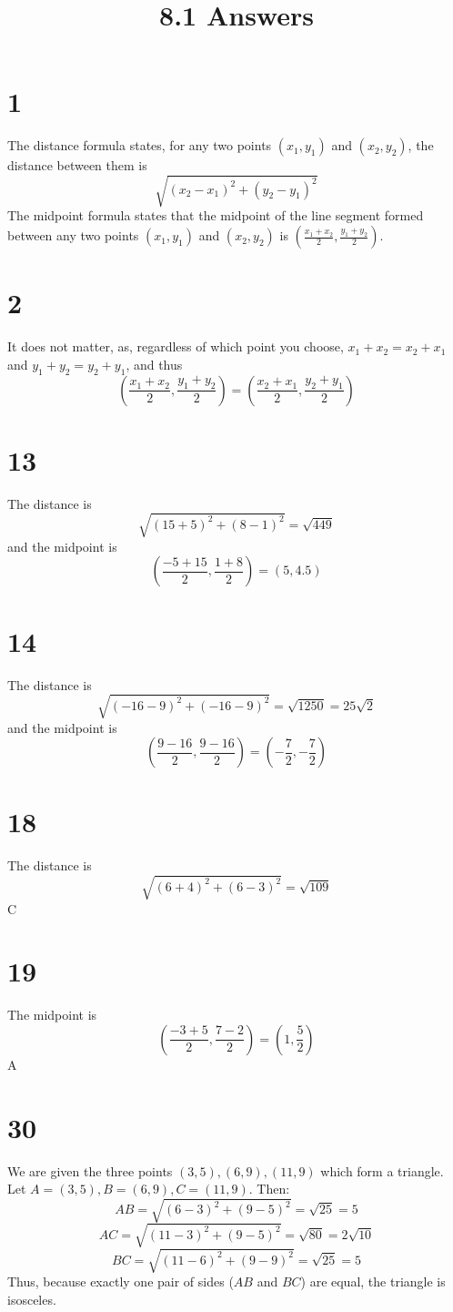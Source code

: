 \documentclass{article}
\title{8.1 Answers}
\theoremstyle{definition}
\newcommand{\?}{\stackrel{?}{=}}
\begin{document}
\maketitle

\section*{1}
The distance formula states, for any two points $(x_1,y_1)$ and $(x_2,y_2)$, the distance between them is \[ \sqrt{(x_2-x_1)^2+(y_2-y_1)^2} \]
The midpoint formula states that the midpoint of the line segment formed between any two points $(x_1,y_1)$ and $(x_2,y_2)$ is
$(\frac{x_1+x_2}{2},\frac{y_1+y_2}{2})$.

\section*{2}
It does not matter, as, regardless of which point you choose, $x_1+x_2=x_2+x_1$ and $y_1+y_2=y_2+y_1$, and thus
\[ (\frac{x_1+x_2}{2},\frac{y_1+y_2}{2})=(\frac{x_2+x_1}{2},\frac{y_2+y_1}{2}) \]

\section*{13}
The distance is \[ \sqrt{(15+5)^2+(8-1)^2}=\sqrt{449} \]
and the midpoint is \[ (\frac{-5+15}{2},\frac{1+8}{2})=(5,4.5) \]

\section*{14}
The distance is \[ \sqrt{(-16-9)^2+(-16-9)^2}=\sqrt{1250}=25\sqrt{2} \]
and the midpoint is \[ (\frac{9-16}{2},\frac{9-16}{2})=(-\frac{7}{2},-\frac{7}{2}) \]

\section*{18}
The distance is \[ \sqrt{(6+4)^2+(6-3)^2}=\sqrt{109} \]
C

\section*{19}
The midpoint is \[ (\frac{-3+5}{2},\frac{7-2}{2})=(1,\frac{5}{2}) \]
A

\section*{30}
We are given the three points $(3,5),(6,9),(11,9)$ which form a triangle. Let $A=(3,5),B=(6,9),C=(11,9)$. Then:
\[ AB=\sqrt{(6-3)^2+(9-5)^2}=\sqrt{25}=5 \]
\[ AC=\sqrt{(11-3)^2+(9-5)^2}=\sqrt{80}=2\sqrt{10} \]
\[ BC=\sqrt{(11-6)^2+(9-9)^2}=\sqrt{25}=5 \]
Thus, because exactly one pair of sides ($AB$ and $BC$) are equal, the triangle is isosceles.
\end{document}
